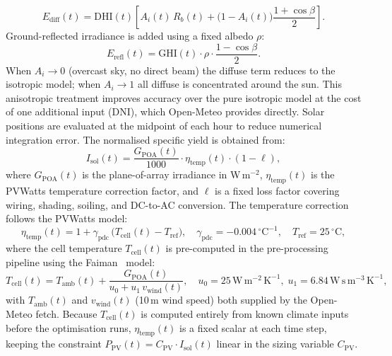 \documentclass[11pt,a4paper]{report}
\begin{document}
\begin{equation}
    E_\mathrm{diff}(t) = \mathrm{DHI}(t)\left[
        A_i(t)\,R_b(t)
        + \bigl(1 - A_i(t)\bigr)\frac{1+\cos\beta}{2}
    \right].
    \label{eq:haydavies_diff}
\end{equation}
Ground-reflected irradiance is added using a fixed albedo $\rho$:
\begin{equation}
    E_\mathrm{refl}(t) = \mathrm{GHI}(t)\cdot\rho\cdot\frac{1-\cos\beta}{2}.
\end{equation}
When $A_i\to0$ (overcast sky, no direct beam) the diffuse term reduces to the
isotropic model; when $A_i\to1$ all diffuse is concentrated around the sun.
This anisotropic treatment improves accuracy over the pure isotropic model at the cost
of one additional input (DNI), which Open-Meteo provides directly.
Solar positions are evaluated at the midpoint of each hour to reduce numerical
integration error.
The normalised specific yield is obtained from:
\begin{equation}
    I_\mathrm{sol}(t) = \frac{G_\mathrm{POA}(t)}{1000} \cdot \eta_\mathrm{temp}(t) \cdot (1 - \ell),
\end{equation}
where $G_\mathrm{POA}(t)$ is the plane-of-array irradiance in W\,m$^{-2}$,
$\eta_\mathrm{temp}(t)$ is the PVWatts temperature correction factor, and
$\ell$ is a fixed loss factor covering wiring, shading, soiling, and DC-to-AC
conversion.
The temperature correction follows the PVWatts model:
\begin{equation}
    \eta_\mathrm{temp}(t) = 1 + \gamma_\mathrm{pdc}\,\bigl(T_\mathrm{cell}(t) - T_\mathrm{ref}\bigr),
    \quad \gamma_\mathrm{pdc} = -0.004\,^{\circ}\mathrm{C}^{-1},
    \quad T_\mathrm{ref} = 25\,^{\circ}\mathrm{C},
    \label{eq:pv_temp_correction}
\end{equation}
where the cell temperature $T_\mathrm{cell}(t)$ is pre-computed in the
pre-processing pipeline using the Faiman~\cite{Faiman2008} model:
\begin{equation}
    T_\mathrm{cell}(t) = T_\mathrm{amb}(t)
        + \frac{G_\mathrm{POA}(t)}{u_0 + u_1\,v_\mathrm{wind}(t)},
    \quad u_0 = 25\,\mathrm{W\,m^{-2}\,K^{-1}},\;
           u_1 = 6.84\,\mathrm{W\,s\,m^{-3}\,K^{-1}},
    \label{eq:faiman}
\end{equation}
with $T_\mathrm{amb}(t)$ and $v_\mathrm{wind}(t)$ (10\,m wind speed) both supplied
by the Open-Meteo fetch.
Because $T_\mathrm{cell}(t)$ is computed entirely from known climate inputs before
the optimisation runs, $\eta_\mathrm{temp}(t)$ is a fixed scalar at each time step,
keeping the constraint $P_\mathrm{PV}(t) = C_\mathrm{PV}\cdot I_\mathrm{sol}(t)$
linear in the sizing variable $C_\mathrm{PV}$.
\end{document}
